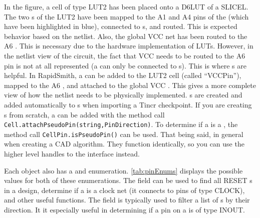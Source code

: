 \noindent
In the figure, a cell of type LUT2 has been placed onto a D6LUT  of a
SLICEL. The two s of the LUT2 have been mapped to the A1 and A4
pins of the  (which have been highlighted in blue), connected to
s, and routed. This is expected behavior based on the netlist.
Also, the global VCC net has been routed to the A6 . This is
necessary due to the hardware implementation of LUTs. However, in the
netlist view of the circuit, the fact that VCC needs to be routed to the A6 pin
is not at all represented (a  can only be connected to
s). This is where s are helpful.
In RapidSmith, a  can be added to the LUT2 cell (called
``VCCPin''), mapped to the A6 , and attached to the global VCC
. This gives a more complete view of how the netlist needs to be
physically implemented. s are created and added
automatically to s when importing a Tincr checkpoint. If you are
creating s from scratch, a  can be added with the
method call \texttt{Cell.attachPseudoPin(string,PinDirection)}. To determine if
a  is a , the method call
\texttt{CellPin.isPseudoPin()} can be used. That
being said, in general  when creating a CAD algorithm. They
function identically, so you can use the higher level handles to the
 interface instead.

Each  object also has a  and 
enumeration. \autoref{tab:pinEnums} displays the possible values for both of
these enumerations. The  field can be used to find all RESET
s in a design, determine if a  is a clock net (it
connects to pins of type CLOCK), and other useful functions. The
 field is typically used to filter a list of s by
their direction. It it especially useful in determining if a pin on a 
is of type INOUT. 

